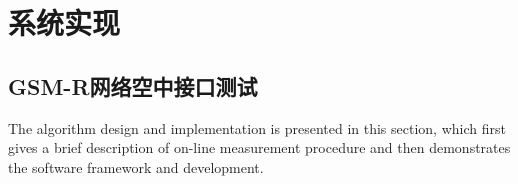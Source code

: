 

\chapter{系统实现}
\label{chap:system}

\section{GSM-R网络空中接口测试}
\label{sec:um}

The algorithm design and implementation is presented in this section, which first gives a brief description of on-line measurement procedure and then demonstrates the software framework and development.

